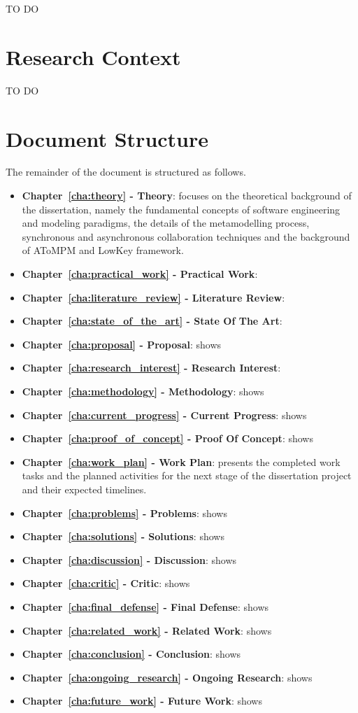 TO DO

\section{Research Context}
\label{sec:research_context}

TO DO

\section{Document Structure}
\label{sec:document_structure}

The remainder of the document is structured as follows.

 \begin{itemize}
    \item \textbf{Chapter~\ref{cha:theory} - Theory}: focuses on the theoretical background of the dissertation, namely the fundamental concepts of software engineering and modeling paradigms, the details of the metamodelling process, synchronous and asynchronous collaboration techniques and the background of AToMPM and LowKey framework.
    \item \textbf{Chapter~\ref{cha:practical_work} - Practical Work}:
    \item \textbf{Chapter~\ref{cha:literature_review} - Literature Review}:
    \item \textbf{Chapter~\ref{cha:state_of_the_art} - State Of The Art}:
    \item \textbf{Chapter~\ref{cha:proposal} - Proposal}: shows 
    \item \textbf{Chapter~\ref{cha:research_interest} - Research Interest}: 
    \item \textbf{Chapter~\ref{cha:methodology} - Methodology}: shows 
    \item \textbf{Chapter~\ref{cha:current_progress} - Current Progress}: shows 
    \item \textbf{Chapter~\ref{cha:proof_of_concept} - Proof Of Concept}: shows 
    \item \textbf{Chapter~\ref{cha:work_plan} - Work Plan}: presents the completed work tasks and the planned activities for the next stage of the dissertation project and their expected timelines.
    \item \textbf{Chapter~\ref{cha:problems} - Problems}: shows 
    \item \textbf{Chapter~\ref{cha:solutions} - Solutions}: shows 
    \item \textbf{Chapter~\ref{cha:discussion} - Discussion}: shows 
    \item \textbf{Chapter~\ref{cha:critic} - Critic}: shows 
    \item \textbf{Chapter~\ref{cha:final_defense} - Final Defense}: shows 
    \item \textbf{Chapter~\ref{cha:related_work} - Related Work}: shows 
    \item \textbf{Chapter~\ref{cha:conclusion} - Conclusion}: shows 
    \item \textbf{Chapter~\ref{cha:ongoing_research} - Ongoing Research}: shows 
    \item \textbf{Chapter~\ref{cha:future_work} - Future Work}: shows 
    

\end{itemize}
